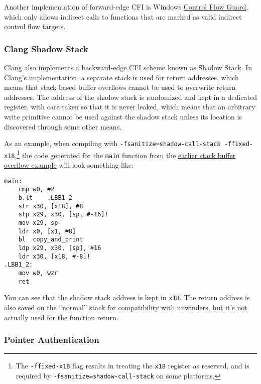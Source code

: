 \documentclass[a4paper,]{report}
\begin{document}
Another implementation of forward-edge CFI is Windows
\href{https://docs.microsoft.com/en-us/windows/win32/secbp/control-flow-guard}{Control
Flow Guard}, which only allows indirect calls to functions that are
marked as valid indirect control flow targets.

\hypertarget{clang-shadow-stack}{%
\subsubsection{Clang Shadow Stack}\label{clang-shadow-stack}}

Clang also implements a backward-edge CFI scheme known as
\href{https://clang.llvm.org/docs/ShadowCallStack.html}{Shadow
Stack}. In Clang's implementation, a separate stack
is used for return addresses, which means that stack-based buffer
overflows cannot be used to overwrite return addresses. The address of
the shadow stack is randomized and kept in a dedicated register, with
care taken so that it is never leaked, which means that an arbitrary
write primitive cannot be used against the shadow stack unless its
location is discovered through some other means.

As an example, when compiling with
\texttt{-fsanitize=shadow-call-stack\ -ffixed-x18},\footnote{The
  \texttt{-ffixed-x18} flag results in treating the \texttt{x18}
  register as reserved, and is required by
  \texttt{-fsanitize=shadow-call-stack} on some platforms.} the code
generated for the \texttt{main} function from the
\protect\hyperlink{stack-buffer-overflow}{earlier stack buffer overflow
example} will look something like:

\begin{verbatim}
main:
    cmp w0, #2
    b.lt    .LBB1_2
    str x30, [x18], #8
    stp x29, x30, [sp, #-16]!
    mov x29, sp
    ldr x0, [x1, #8]
    bl  copy_and_print
    ldp x29, x30, [sp], #16
    ldr x30, [x18, #-8]!
.LBB1_2:
    mov w0, wzr
    ret
\end{verbatim}

You can see that the shadow stack address is kept in \texttt{x18}. The
return address is also saved on the ``normal'' stack for compatibility
with unwinders, but it's not actually used for the function return.

\hypertarget{pointer-authentication}{%
\subsubsection{Pointer Authentication}\label{pointer-authentication}}
\end{document}
